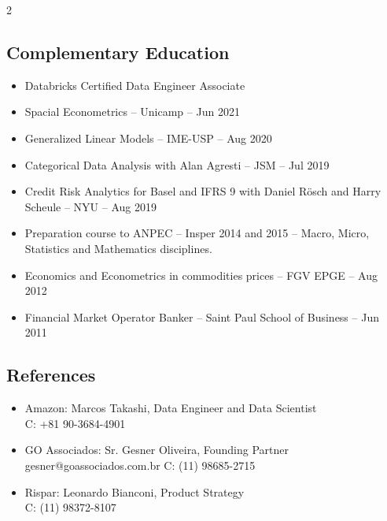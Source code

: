\documentclass{article}
\begin{document}
\begin{multicols}{2}
\subsection{Complementary Education}
\begin{itemize}
\item{Databricks Certified Data Engineer Associate}
\item{Spacial Econometrics – Unicamp – Jun 2021}  
\item{Generalized Linear Models – IME-USP – Aug 2020} 
\item{Categorical Data Analysis with Alan Agresti – JSM – Jul 2019} 
\item{Credit Risk Analytics for Basel and IFRS 9 with Daniel Rösch and Harry Scheule – NYU – Aug 2019} 
\item{Preparation course to ANPEC – Insper 2014 and 2015 – Macro, Micro, Statistics and Mathematics disciplines.} 
\item{Economics and Econometrics in commodities prices – FGV EPGE – Aug 2012} 
\item{Financial Market Operator Banker – Saint Paul School of Business – Jun 2011}
\end{itemize}

\subsection{References}
\begin{itemize}
\item{Amazon: Marcos Takashi, Data Engineer and Data Scientist \\C: +81 90-3684-4901} 
\item{GO Associados: Sr. Gesner Oliveira, Founding Partner\\gesner@goassociados.com.br C: (11) 98685-2715} 
\item{Rispar: Leonardo Bianconi, Product Strategy \\C: (11) 98372-8107}
\end{itemize}

\end{multicols}
\end{document}
